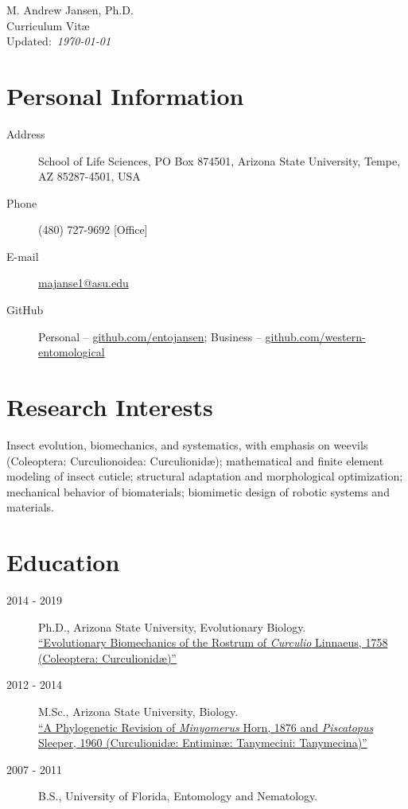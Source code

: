 \documentclass[12pt,a4paper]{article}
\begin{document}
\begin{center}
	{\LARGE M. Andrew Jansen, Ph.D.}\\
	\medskip
	{\Large Curriculum Vit\ae}\\
	Updated:~\textit{\today}
\end{center}

\section*{Personal Information}
	\begin{description}
		\item [Address] \tabto*{2cm} School of Life Sciences, PO Box 874501, Arizona State University, Tempe, AZ 85287-4501, USA
		\item [Phone] \tabto*{2cm} (480) 727-9692 [Office]
		\item [E-mail] \tabto*{2cm} \href{mailto:majanse1@asu.edu}{majanse1@asu.edu}
		\item [GitHub] \tabto*{2cm} Personal -- \href{https://github.com/entojansen}{github.com/entojansen};
		Business -- \href{https://github.com/western-entomological}{github.com/western-entomological}
	\end{description}

\section*{Research Interests}
	Insect evolution, biomechanics, and systematics, with emphasis on weevils (Coleoptera: Curculionoidea: Curculionid\ae);
	mathematical and finite element modeling of insect cuticle;
	structural adaptation and morphological optimization;
	mechanical behavior of biomaterials;
	biomimetic design of robotic systems and materials.

\section*{Education}
	\begin{description}
		\item [2014 - 2019] Ph.D., Arizona State University, Evolutionary Biology.
		\\ \href{https://repository.asu.edu/items/53836}{``Evolutionary Biomechanics of the Rostrum of \textit{Curculio} Linnaeus, 1758
		(Coleoptera: Curculionid\ae)''}
		\item [2012 - 2014] M.Sc., Arizona State University, Biology.
		\\ \href{https://repository.asu.edu/items/25115}{``A Phylogenetic Revision of \textit{Minyomerus} Horn, 1876 and \textit{Piscatopus} Sleeper, 1960
		(Curculionid\ae: Entimin\ae: Tanymecini: Tanymecina)''}
		\item [2007 - 2011] B.S., University of Florida, Entomology and Nematology.
	\end{description}
\end{document}
